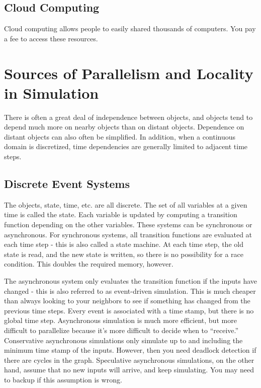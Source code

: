 \documentclass[10pt]{article}
\begin{document}
\begin{flushleft}
\subsection{Cloud Computing}

Cloud computing allows people to easily shared thousands of computers. You pay a fee to access these resources.

\section{Sources of Parallelism and Locality in Simulation}

There is often a great deal of independence between objects, and objects tend to depend much more on nearby objects than on distant objects. Dependence on distant objects can also often be simplified. In addition, when a continuous domain is discretized, time dependencies are generally limited to adjacent time steps. 

\subsection{Discrete Event Systems}

The objects, state, time, etc. are all discrete. The set of all variables at a given time is called the state. Each variable is updated by computing a transition function depending on the other variables. These systems can be synchronous or asynchronous. For synchronous systems, all transition functions are evaluated at each time step - this is also called a state machine. At each time step, the old state is read, and the new state is written, so there is no possibility for a race condition. This doubles the required memory, however. 

The asynchronous system only evaluates the transition function if the inputs have changed - this is also referred to as event-driven simulation. This is much cheaper than always looking to your neighbors to see if something has changed from the previous time steps. Every event is associated with a time stamp, but there is no global time step. Asynchronous simulation is much more efficient, but more difficult to parallelize because it's more difficult to decide when to ``receive.'' Conservative asynchronous simulations only simulate up to and including the minimum time stamp of the inputs. However, then you need deadlock detection if there are cycles in the graph. Speculative asynchronous simulations, on the other hand, assume that no new inputs will arrive, and keep simulating. You may need to backup if this assumption is wrong. 


\end{flushleft}
\end{document}
